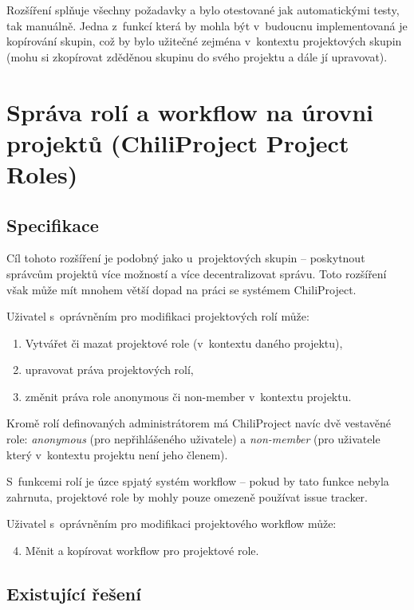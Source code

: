 \documentclass[thesis=B,czech]{FITthesis}[2012/05/02]
\begin{document}
Rozšíření splňuje všechny požadavky a bylo otestované jak automatickými
testy, tak manuálně. Jedna z~funkcí která by mohla být v~budoucnu
implementovaná je kopírování skupin, což by bylo užitečné zejména
v~kontextu projektových skupin (mohu si zkopírovat zděděnou skupinu do
svého projektu a dále jí upravovat).

\section[Správa rolí a workflow na úrovni projektů]{Správa rolí a workflow na úrovni projektů (ChiliProject Project
Roles)}
\label{sec:project_roles}

\subsection{Specifikace}

Cíl tohoto rozšíření je podobný jako u~projektových skupin -- poskytnout
správcům projektů více možností a více decentralizovat správu. Toto
rozšíření však může mít mnohem větší dopad na práci se systémem
ChiliProject.

Uživatel s~oprávněním pro modifikaci projektových rolí může:

\begin{enumerate}[1.]
\item
  Vytvářet či mazat projektové role (v~kontextu daného projektu),
\item
  upravovat práva projektových rolí,
\item
  změnit práva role anonymous či non-member v~kontextu projektu.
\end{enumerate}
Kromě rolí definovaných administrátorem má ChiliProject navíc dvě
vestavěné role: \emph{anonymous} (pro nepřihlášeného uživatele) a
\emph{non-member} (pro uživatele který v~kontextu projektu není jeho
členem).

S~funkcemi rolí je úzce spjatý systém \gls{workflow} -- pokud by tato
funkce nebyla zahrnuta, projektové role by mohly pouze omezeně používat
issue tracker.

Uživatel s~oprávněním pro modifikaci projektového \gls{workflow} může:

\begin{enumerate}[1.]
\setcounter{enumi}{3}
\item
  Měnit a kopírovat workflow pro projektové role.
\end{enumerate}
\subsection{Existující řešení}
\end{document}
